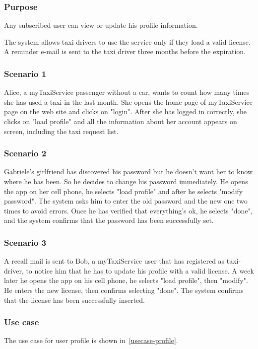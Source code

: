 \label{user-profile}
\subsubsection{Purpose}
Any subscribed user can view or update his profile information. 

The system allows taxi drivers to use the service only if they load a valid license. A reminder e-mail is sent to the taxi driver three months before the expiration. 


\subsubsection{Scenario 1}
Alice, a myTaxiService passenger without a car, wants to count how many times she has used a taxi in the last month.
She opens the home page of myTaxiService page on the web site and clicks on "login". 
After she has logged in correctly, she clicks on "load profile" and all the information about her account appears on screen, including the taxi request list. 

\subsubsection{Scenario 2}
Gabriele's girlfriend has discovered his password but he doesn't want her to know where he has been. So he decides to change his password immediately. He opens the app on her cell phone, he selects "load profile" and after he selects "modify password". The system asks him to enter the old password and the new one two times to avoid errors. Once he has verified that everything's ok, he selects "done", and the system confirms that the password has been successfully set.

\subsubsection{Scenario 3}
A recall mail is sent to Bob, a myTaxiService user that has registered as taxi-driver, to notice him that he has to update his profile with a valid license. A week later he opens the app on his cell phone, he selects "load profile", then "modify". He enters the new license, then confirms selecting "done". The system confirms that the license has been successfully inserted.


\subsubsection{Use case}
The use case for user profile is shown in~\autoref{usecase-profile}.

